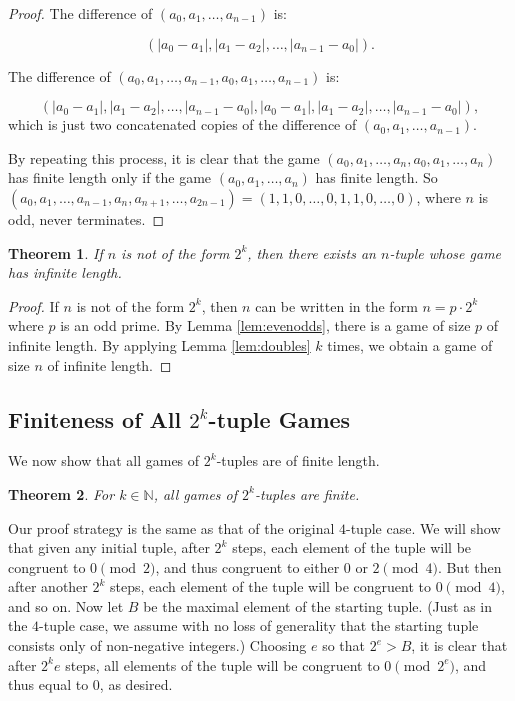 \documentclass[12pt]{amsart}
\newtheorem{theorem}{Theorem}[section]
\newcommand{\breathe}{\vspace{0.2cm}}
\newcommand{\znn}{\mathbb{N}}
\begin{document}
\begin{proof}

The difference of $(a_0, a_1, \ldots, a_{n-1})$ is:

$$(|a_0 - a_1|, |a_1 - a_2|, \ldots, |a_{n-1} - a_0|).$$

\breathe

The difference of $(a_0, a_1, \ldots, a_{n-1}, a_0, a_1, \ldots, a_{n-1})$ is:

$$(|a_0 - a_1|, |a_1 - a_2|, \ldots, |a_{n-1} - a_0|, |a_0 - a_1|, |a_1 - a_2|, \ldots, |a_{n-1} - a_0|),$$
which is just two concatenated copies of the difference of $(a_0, a_1, \ldots, a_{n-1})$.

By repeating this process, it is clear that the game $(a_0, a_1, \ldots, a_n, a_0, a_1, \ldots, a_n)$ has finite length only if the game $(a_0, a_1, \ldots, a_n)$ has finite length. So $(a_0, a_1, \ldots, a_{n-1}, a_n, a_{n+1}, \ldots, a_{2n-1}) = (1, 1, 0, \ldots, 0, 1, 1, 0, \ldots, 0)$, where $n$ is odd, never terminates. 

\end{proof}

\begin{theorem}
\label{theorem:notPowersOfTwo}
If $n$ is not of the form $2^k$, then there exists an $n$-tuple whose game has infinite length.
\end{theorem}

\begin{proof}

If $n$ is not of the form $2^k$, then $n$ can be written in the form $n = p \cdot 2^k$ where $p$ is an odd prime. By Lemma \ref{lem:evenodds}, there is a game of size $p$ of infinite length. By applying Lemma \ref{lem:doubles} $k$ times, we obtain a game of size $n$ of infinite length. 
\end{proof}

\subsection{Finiteness of All $2^k$-tuple Games}

We now show that all games of $2^k$-tuples are of finite length.

\begin{theorem}
For $k\in \znn$, all games of $2^k$-tuples are finite.
\end{theorem}

Our proof strategy is the same as that of the original $4$-tuple case. We will show that given any initial tuple, after $2^k$ steps, each element of the tuple will be congruent to $0\pmod{2}$, and thus congruent to either $0$ or $2\pmod{4}$. But then after another $2^k$ steps, each element of the tuple will be congruent to $0\pmod{4}$, and so on. Now let $B$ be the maximal element of the starting tuple. (Just as in the $4$-tuple case, we assume with no loss of generality that the starting tuple consists only of non-negative integers.) Choosing $e$ so that $2^e>B$, it is clear that after $2^ke$ steps, all elements of the tuple will be congruent to $0\pmod{2^e}$, and thus equal to $0$, as desired.
\end{document}
